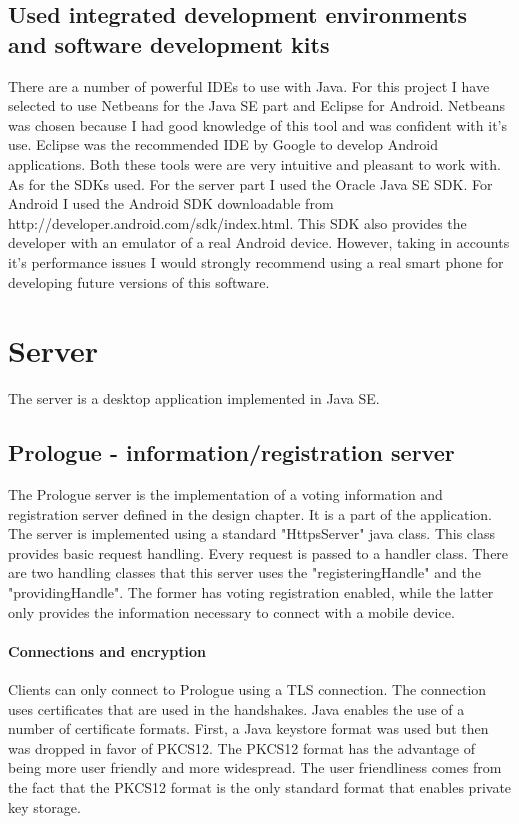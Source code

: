 \documentclass[11pt,twoside,a4paper]{book}
\begin{document}
\subsection{Used integrated development environments and software development kits}
There are a number of powerful IDEs to use with Java. For this project I have selected to use Netbeans for the Java SE part and Eclipse for Android. Netbeans was chosen because I had good knowledge of this tool and was confident with it's use. Eclipse was the recommended IDE by Google to develop Android applications. Both these tools were are very intuitive and pleasant to work with. \\
As for the SDKs used. For the server part I used the Oracle Java SE SDK. For Android I used the Android SDK downloadable from http://developer.android.com/sdk/index.html. This SDK also provides the developer with an emulator of a real Android device. However, taking in accounts it's performance issues I would strongly recommend using a real smart phone for developing future versions of this software.

\section{Server}
The server is a desktop application implemented in Java SE.
\subsection{Prologue - information/registration server}
The Prologue server is the implementation of a voting information and registration server defined in the design chapter. It is a part of the application. The server is implemented using a standard "HttpsServer" java class. This class provides basic request handling. Every request is passed to a handler class. There are two handling classes that this server uses the "registeringHandle" and the "providingHandle". The former has voting registration enabled, while the latter only provides the information necessary to connect with a mobile device.
\paragraph{Connections and encryption}
Clients can only connect to Prologue using a TLS\cite{tls} connection. The connection uses certificates that are used in the handshakes. Java enables the use of a number of certificate formats. First, a Java keystore format was used but then was dropped in favor of PKCS12\cite{pkcs12}. The PKCS12 format has the advantage of being more user friendly and more widespread. The user friendliness comes from the fact that the PKCS12 format is the only standard format that enables private key storage.
\end{document}
